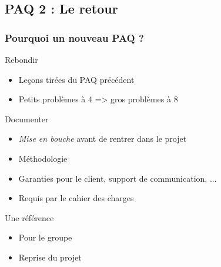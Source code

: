 \subsection{PAQ 2 : Le retour}

\begin{frame}
\tableofcontents[subsectionstyle=show/shaded/hide, subsubsectionstyle=hide, sectionstyle=show/hide]
\end{frame}

\begin{frame}[allowframebreaks]
\frametitle{Pourquoi un nouveau PAQ ?}

\begin{block}{Rebondir} %
\begin{itemize}
	\item Leçons tirées du PAQ précédent %
	\item Petits problèmes à 4 => gros problèmes à 8 %
\end{itemize}
\end{block} %

\begin{block}{Documenter}
\begin{itemize}
    \item \emph{Mise en bouche} avant de rentrer dans le projet %
    \item Méthodologie %
    \item Garanties pour le client, support de communication, ...
    \item Requis par le cahier des charges
\end{itemize}
\end{block}

\begin{block}{Une référence}
\begin{itemize}
    \item Pour le groupe %
    \item Reprise du projet %
\end{itemize}
\end{block}

\end{frame} %

